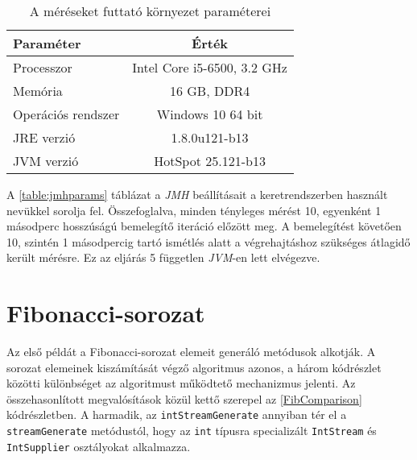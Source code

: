 \begin{table}[h]
\captionsetup{justification=centering}
\centering
  \begin{tabular}{|| l | c ||}
  \hline
  Paraméter & Érték \\
  \hline \hline
  Processzor                  & Intel Core i5-6500, 3.2 GHz \\
  Memória                     & 16 GB, DDR4 \\
  \hline
  Operációs rendszer                        & Windows 10 64 bit \\
  \hline
  JRE verzió                  & 1.8.0u121-b13 \\
  JVM verzió                  & HotSpot 25.121-b13 \\
  \hline
  \end{tabular}
\caption{A méréseket futtató környezet paraméterei}  
\label{table:envparams}
\end{table}

A \ref{table:jmhparams} táblázat a \textit{JMH} beállításait a keretrendszerben használt nevükkel sorolja fel. Összefoglalva, minden tényleges mérést 10, egyenként 1 másodperc hosszúságú bemelegítő iteráció előzött meg. A bemelegítést követően 10, szintén 1 másodpercig tartó ismétlés alatt a végrehajtáshoz szükséges átlagidő került mérésre. Ez az eljárás 5 független \textit{JVM}-en lett elvégezve.

\section{Fibonacci-sorozat}

Az első példát a Fibonacci-sorozat elemeit generáló metódusok alkotják. A sorozat elemeinek kiszámítását végző algoritmus azonos, a három kódrészlet közötti különbséget az algoritmust működtető mechanizmus jelenti. Az összehasonlított megvalósítások közül kettő szerepel az \ref{FibComparison} kódrészletben. A harmadik, az \texttt{intStreamGenerate} annyiban tér el a \texttt{streamGenerate} metódustól, hogy az \texttt{int} típusra specializált \texttt{IntStream} és \texttt{IntSupplier} osztályokat alkalmazza.

